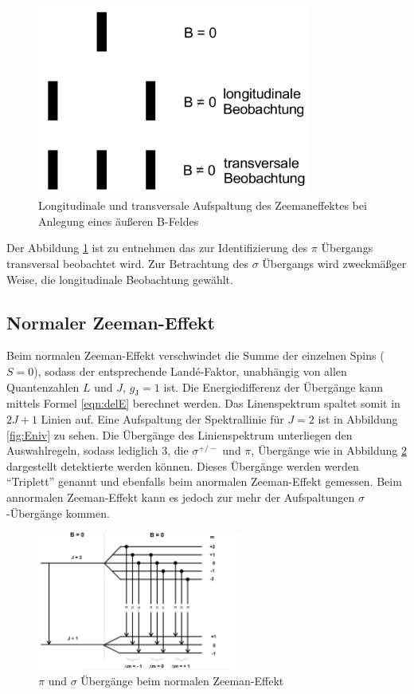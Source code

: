 \begin{figure}[H]
  \centering
  \includegraphics[width=0.8\textwidth]{./Bilder/Aufspaltung.png}
  \caption{Longitudinale und transversale Aufspaltung des Zeemaneffektes bei Anlegung eines äußeren B-Feldes \cite{V27}}
  \label{fig:aufZe}
\end{figure}
Der Abbildung \ref{fig:aufZe} ist zu entnehmen das zur Identifizierung des $\pi$ Übergangs transversal beobachtet wird. Zur Betrachtung des $\sigma$ Übergangs wird zweckmäßger Weise, die longitudinale Beobachtung gewählt. 
\subsection{Normaler Zeeman-Effekt}
Beim normalen Zeeman-Effekt verschwindet die Summe der einzelnen Spins ($S=0$), sodass der entsprechende Landé-Faktor, unabhängig von allen Quantenzahlen $L$ und $J$, $g_\text{J} = 1$ ist. Die Energiedifferenz der Übergänge kann mittels Formel \ref{eqn:delE} berechnet werden. Das Linenspektrum spaltet somit in $2 J + 1$ Linien auf. Eine Aufspaltung der Spektrallinie für $J = 2$ ist in Abbildung \ref{fig:Eniv} zu sehen.
Die Übergänge des Linienspektrum unterliegen den Auswahlregeln, sodass lediglich 3, die $\sigma^{+/-}$ und $\pi$, Übergänge wie in Abbildung \ref{fig:adf} dargestellt detektierte werden können. Dieses Übergänge werden werden ``Triplett'' genannt und ebenfalls beim anormalen Zeeman-Effekt gemessen. Beim annormalen Zeeman-Effekt kann es jedoch zur mehr der Aufspaltungen $\sigma$-Übergänge kommen.
\begin{figure}[H]
  \centering
  \includegraphics[width=0.6\textwidth]{./Bilder/asd.pdf}
  \caption{$\pi$ und $\sigma$ Übergänge beim normalen Zeeman-Effekt \cite{V27}}
  \label{fig:adf}
\end{figure}

